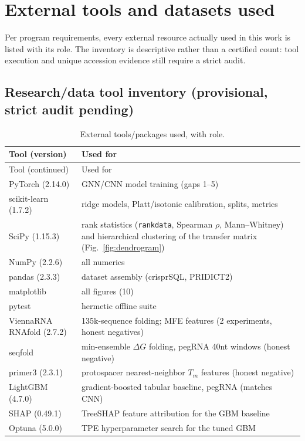 \section{External tools and datasets used}
\label{sec:toolsdata}
Per program requirements, every external resource actually used in this
work is listed with its role. The inventory is descriptive rather than a certified count: tool execution and unique accession evidence still require a strict audit.

\subsection{Research/data tool inventory (provisional, strict audit pending)}
\begingroup\footnotesize\setlength{\tabcolsep}{4pt}
\begin{longtable}{@{}p{}p{}@{}}
\caption{External tools/packages used, with role.}\label{tab:tools}\\
\hline
Tool (version) & Used for \\\hline\endfirsthead
\hline Tool (continued) & Used for \\\hline\endhead
PyTorch (2.14.0) & GNN/CNN model training (gaps 1--5) \\
scikit-learn (1.7.2) & ridge models, Platt/isotonic calibration, splits, metrics \\
SciPy (1.15.3) & rank statistics (\texttt{rankdata}, Spearman $\rho$, Mann--Whitney) and hierarchical clustering of the transfer matrix (Fig.~\ref{fig:dendrogram}) \\
NumPy (2.2.6) & all numerics \\
pandas (2.3.3) & dataset assembly (crisprSQL, PRIDICT2) \\
matplotlib & all figures (10) \\
pytest & hermetic offline suite \\
ViennaRNA RNAfold (2.7.2) & 135k-sequence folding; MFE features (2 experiments, honest negatives) \\
seqfold & min-ensemble $\Delta G$ folding, pegRNA 40nt windows (honest negative) \\
primer3 (2.3.1) & protospacer nearest-neighbor $T_m$ features (honest negative) \\
LightGBM (4.7.0) & gradient-boosted tabular baseline, pegRNA (matches CNN) \\
SHAP (0.49.1) & TreeSHAP feature attribution for the GBM baseline \\
Optuna (5.0.0) & TPE hyperparameter search for the tuned GBM \\

\end{longtable}
